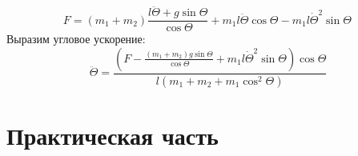 \documentclass[a5paper, 10pt]{article}
\theoremstyle{definition}
\theoremstyle{plain}
\theoremstyle{remark}
\begin{document}
\begin{equation}
F = (m_1 + m_2) \frac{l \ddot{\Theta} + g \sin \Theta }{ \cos \Theta} + m_1 l \ddot{\Theta} \cos \Theta - m_1 l \dot{\Theta} ^2 \sin \Theta \,
\end{equation}
Выразим угловое ускорение:
\begin{equation}
\ddot{\Theta} = \frac{\left( F - \frac{(m_1 + m_2) g \sin \Theta}{\cos \Theta} + m_1 l \dot{\Theta}^2 \sin \Theta \right) \cos \Theta}{l \left( m_1 + m_2 + m_1 \cos^2 \Theta \right)}
\end{equation}

\newpage
\section{Практическая часть}	
\end{document}
